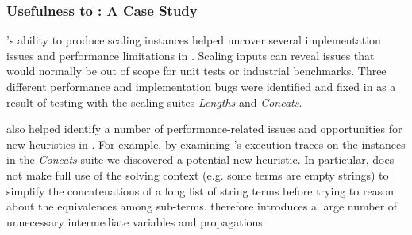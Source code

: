 \subsubsection{Usefulness to \us{}: A Case Study}

\fuzzer{}'s ability to produce scaling instances helped uncover several
implementation issues and performance limitations in \us{}. Scaling inputs
can reveal issues that would normally be out of scope for unit tests or
industrial benchmarks. Three different
performance and implementation bugs were identified and fixed in \us{}
as a result of testing with the \fuzzer{} scaling suites
\textit{Lengths} and \textit{Concats}.

\fuzzer{} also helped identify a number of performance-related issues and
opportunities for new heuristics in \us{}. For example, by examining \us{}'s
execution traces on the
instances in the \textit{Concats} suite we discovered a
potential new heuristic. In particular, \us{} does not
make full use of the solving context (e.g. some terms are empty
strings) to simplify the concatenations of a long list of string terms
before trying to reason about the equivalences among sub-terms. \us{}
therefore introduces a large number of unnecessary intermediate
variables and propagations.
